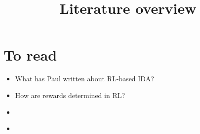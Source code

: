 \documentclass{farlamp}
\title{Literature overview}
\begin{document}
\maketitle

\section{To read}

\begin{itemize}
    \item What has Paul written about RL-based IDA?
    \item How are rewards determined in RL?
    \item \cite{ChriREngP}
    \item \cite{ChriThoRewE}
\end{itemize}
\end{document}
